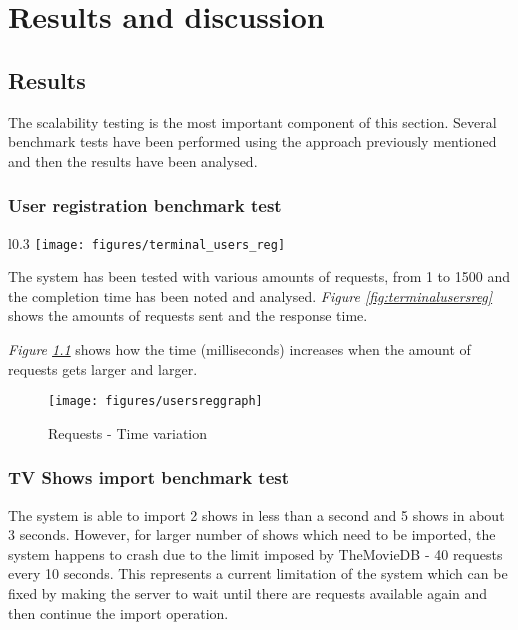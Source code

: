 \chapter{Results and discussion}

\section{Results}

The scalability testing is the most important component of this section. Several benchmark tests have been performed using the approach previously mentioned and then the results have been analysed.

\subsection{User registration benchmark test}

\begin{wrapfigure}{l}{0.3\textwidth}
\vspace{-1em}
\centering
\texttt{[image: figures/terminal\_users\_reg]}
\caption{User signup benchmark test}
\vspace{-5em}
\label{fig:terminalusersreg}
\end{wrapfigure}

The system has been tested with various amounts of requests, from 1 to 1500 and the completion time has been noted and analysed. \textit{Figure \ref{fig:terminalusersreg}} shows the amounts of requests sent and the response time.

\textit{Figure \ref{fig:usersreggraph}} shows how the time (milliseconds) increases when the amount of requests gets larger and larger.

\begin{figure}[h]
\centering
\texttt{[image: figures/usersreggraph]}
\caption{Requests - Time variation}
\label{fig:usersreggraph}
\end{figure}

\subsection{TV Shows import benchmark test}

The system is able to import 2 shows in less than a second and 5 shows in about 3 seconds. However, for larger number of shows which need to be imported, the system happens to crash due to the limit imposed by TheMovieDB - 40 requests every 10 seconds. This represents a current limitation of the system which can be fixed by making the server to wait until there are requests available again and then continue the import operation.

